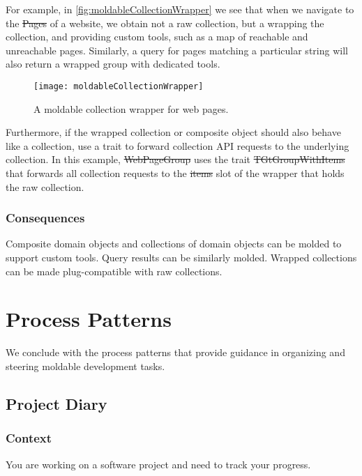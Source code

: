 \documentclass[sigconf]{acmart}
\renewcommand{\nbc}[3]{} %
\newcommand\on[1]{\nbc{ON}{#1}{olive}} %
\begin{document}
For example, in \autoref{fig:moldableCollectionWrapper} we see that when we navigate to the \st{Pages} of a website, we obtain not a raw collection, but a  wrapping the collection, and providing custom tools, such as a map of reachable and unreachable pages.
Similarly, a query for pages matching a particular string will also return a wrapped group with dedicated tools.

\begin{figure}[h]
  \texttt{[image: moldableCollectionWrapper]}
  \caption{A moldable collection wrapper for web pages.}
  \label{fig:moldableCollectionWrapper}
\end{figure}

Furthermore, if the wrapped collection or composite object should also behave like a collection, use a trait to forward collection API requests to the underlying collection.
In this example, \st{WebPageGroup} uses the trait \st{TGtGroupWithItems} that forwards all collection requests to the \st{items} slot of the wrapper that holds the raw collection.

\subsubsection*{Consequences}
Composite domain objects and collections of domain objects can be molded to support custom tools.
Query results can be similarly molded.
Wrapped collections can be made plug-compatible with raw collections.

\section{Process Patterns}\label{sec:process}

We conclude with the process patterns that provide guidance in organizing and steering moldable development tasks.

\subsection*{Project Diary}\label{pat:projectDiary}

\subsubsection*{Context}
You are working on a software project and need to track your progress.
\end{document}

